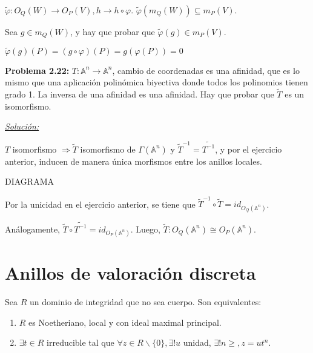 \begin{nota}
$\tilde{\varphi}:O_Q(W)\rightarrow O_P(V), h\rightarrow h\circ \varphi$. $\tilde{\varphi}(m_Q(W))\subseteq m_P(V)$. 

Sea $g\in m_Q(W)$, y hay que probar que $\tilde{\varphi}(g)\in m_P(V)$. 

$\tilde{\varphi}(g)(P)= (g\circ \varphi)(P)=g(\varphi(P))=0$
\end{nota}

\textbf{Problema 2.22: } $T:\mathbb{A}^n\rightarrow \mathbb{A}^n$, cambio de coordenadas es una afinidad, que es lo mismo que una aplicación polinómica biyectiva donde todos los polinomios tienen grado 1. La inversa de una afinidad es una afinidad. Hay que probar que $\tilde{T}$ es un isomorfismo.

\underline{\textit{Solución: }}

$T$ isomorfismo $\Rightarrow \tilde{T}$ isomorfismo de $\Gamma(\mathbb{A}^n)$ y $\tilde{T}^{-1}=\tilde{T^{-1}}$, y por el ejercicio anterior, inducen de manera única morfismos entre los anillos locales. 

DIAGRAMA

Por la unicidad en el ejercicio anterior, se tiene que $\tilde{T}^{-1}\circ \tilde{T}=id_{O_Q(\mathbb{A}^n)}$.

Análogamente, $\tilde{T}\circ \tilde{T^{-1}}=id_{O_P(\mathbb{A}^n)}$.
Luego, $\tilde{T}:O_Q(\mathbb{A}^n)\cong O_P(\mathbb{A}^n)$.

\section{Anillos de valoración discreta}

\begin{Prop}
Sea $R$ un dominio de integridad que no sea cuerpo. Son equivalentes:
\begin{enumerate}
\item $R$ es Noetheriano, local y con ideal maximal principal.
\item $\exists t\in R$ irreducible tal que $\forall z\in R \backslash \{0\}, \exists ! u$ unidad, $\exists ! n \ge, z=ut^n$.
\end{enumerate}
\end{Prop}

